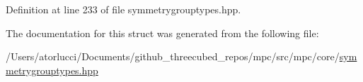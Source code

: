 Definition at line 233 of file symmetrygrouptypes.\+hpp.



The documentation for this struct was generated from the following file\+:\begin{DoxyCompactItemize}
\item 
/\+Users/atorlucci/\+Documents/github\+\_\+threecubed\+\_\+repos/mpc/src/mpc/core/\mbox{\hyperlink{symmetrygrouptypes_8hpp}{symmetrygrouptypes.\+hpp}}\end{DoxyCompactItemize}
